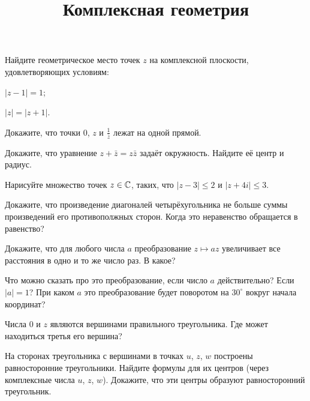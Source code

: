 \documentclass[a4paper, 12pt, num=23]{listok}
\begin{document}
\title{Комплексная геометрия}
\maketitle{}
\begin{problem}
	Найдите геометрическое место точек $z$ на комплексной плоскости, удовлетворяющих условиям:
	\begin{probparts}
		\item $|z - 1| = 1$;
		\item $|z| = |z + 1|$.
	\end{probparts}
\end{problem}
\begin{problem}
	Докажите, что точки $0$, $z$ и $\frac1{\bar z}$ лежат на одной прямой.
\end{problem}
\begin{problem}
	Докажите, что уравнение $z + \bar z = z\bar z$ задаёт окружность. Найдите её центр и радиус.
\end{problem}
\begin{problem}
	Нарисуйте множество точек $z \in \mathbb{C}$, таких, что $|z - 3| \le 2$ и $|z + 4i| \le 3$.
\end{problem}
\begin{problem}
	Докажите, что произведение диагоналей четырёхугольника не больше суммы произведений его противополжных сторон. Когда это неравенство обращается в равенство?
\end{problem}
\begin{problem}
	Докажите, что для любого числа $a$ преобразование $z \mapsto az$ увеличивает все расстояния в одно и то же число раз. В какое?
\end{problem}
\begin{problem}
	Что можно сказать про это преобразование, если число $a$ действительно? Если $|a| = 1$?
	При каком $a$ это преобразование будет поворотом на $30^\circ$ вокруг начала координат?
\end{problem}
\begin{problem}
\begin{probparts}
	\item Числа $0$ и $z$ являются вершинами правильного треугольника.
	Где может находиться третья его вершина?
	\item На сторонах треугольника с вершинами в точках $u$, $z$, $w$ построены равносторонние треугольники.
	Найдите формулы для их центров (через комплексные числа $u$, $z$, $w$). Докажите, что эти центры образуют равносторонний треугольник.
\end{probparts}
\end{problem}
\end{document}
